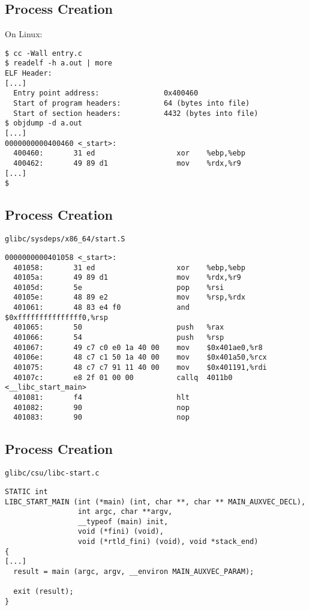 \documentclass[xga]{xdvislides}
\begin{document}
\subsection{Process Creation}
On Linux:
\begin{verbatim}
$ cc -Wall entry.c
$ readelf -h a.out | more
ELF Header:
[...]
  Entry point address:               0x400460
  Start of program headers:          64 (bytes into file)
  Start of section headers:          4432 (bytes into file)
$ objdump -d a.out
[...]
0000000000400460 <_start>:
  400460:       31 ed                   xor    %ebp,%ebp
  400462:       49 89 d1                mov    %rdx,%r9
[...]
$
\end{verbatim}

\subsection{Process Creation}
\verb+glibc/sysdeps/x86_64/start.S+

\begin{verbatim}
0000000000401058 <_start>:
  401058:       31 ed                   xor    %ebp,%ebp
  40105a:       49 89 d1                mov    %rdx,%r9
  40105d:       5e                      pop    %rsi
  40105e:       48 89 e2                mov    %rsp,%rdx
  401061:       48 83 e4 f0             and    $0xfffffffffffffff0,%rsp
  401065:       50                      push   %rax
  401066:       54                      push   %rsp
  401067:       49 c7 c0 e0 1a 40 00    mov    $0x401ae0,%r8
  40106e:       48 c7 c1 50 1a 40 00    mov    $0x401a50,%rcx
  401075:       48 c7 c7 91 11 40 00    mov    $0x401191,%rdi
  40107c:       e8 2f 01 00 00          callq  4011b0 <__libc_start_main>
  401081:       f4                      hlt
  401082:       90                      nop
  401083:       90                      nop
\end{verbatim}

\subsection{Process Creation}
\verb+glibc/csu/libc-start.c+

\begin{verbatim}
STATIC int
LIBC_START_MAIN (int (*main) (int, char **, char ** MAIN_AUXVEC_DECL),
                 int argc, char **argv,
                 __typeof (main) init,
                 void (*fini) (void),
                 void (*rtld_fini) (void), void *stack_end)
{
[...]
  result = main (argc, argv, __environ MAIN_AUXVEC_PARAM);

  exit (result);
}
\end{verbatim}
\end{document}
